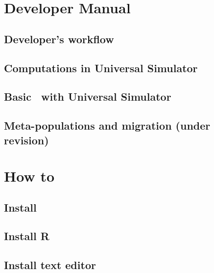 \documentclass [a4paper, 11pt, openany]  {memoir}
\begin{document}

\part{Developer Manual}

\chapter{Developer's workflow}

\chapter{Computations in Universal Simulator}

\chapter{Basic \protect\CPP\ with Universal Simulator}

\chapter{Meta-populations and migration (under revision)}


\part{How to}

\chapter{Install \protect\US}

\chapter{Install R}

\chapter{Install text editor}
\end{document}
